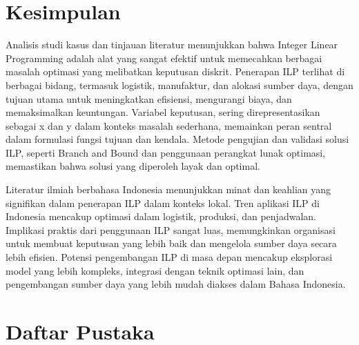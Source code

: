 \documentclass{IEEEtran}
\begin{document}
\section{Kesimpulan}

Analisis studi kasus dan tinjauan literatur menunjukkan bahwa Integer Linear Programming adalah alat yang sangat efektif untuk memecahkan berbagai masalah optimasi yang melibatkan keputusan diskrit. Penerapan ILP terlihat di berbagai bidang, termasuk logistik, manufaktur, dan alokasi sumber daya, dengan tujuan utama untuk meningkatkan efisiensi, mengurangi biaya, dan memaksimalkan keuntungan. Variabel keputusan, sering direpresentasikan sebagai x dan y dalam konteks masalah sederhana, memainkan peran sentral dalam formulasi fungsi tujuan dan kendala. Metode pengujian dan validasi solusi ILP, seperti Branch and Bound dan penggunaan perangkat lunak optimasi, memastikan bahwa solusi yang diperoleh layak dan optimal.

Literatur ilmiah berbahasa Indonesia menunjukkan minat dan keahlian yang signifikan dalam penerapan ILP dalam konteks lokal. Tren aplikasi ILP di Indonesia mencakup optimasi dalam logistik, produksi, dan penjadwalan. Implikasi praktis dari penggunaan ILP sangat luas, memungkinkan organisasi untuk membuat keputusan yang lebih baik dan mengelola sumber daya secara lebih efisien. Potensi pengembangan ILP di masa depan mencakup eksplorasi model yang lebih kompleks, integrasi dengan teknik optimasi lain, dan pengembangan sumber daya yang lebih mudah diakses dalam Bahasa Indonesia.

\section*{Daftar Pustaka}


\end{document}
